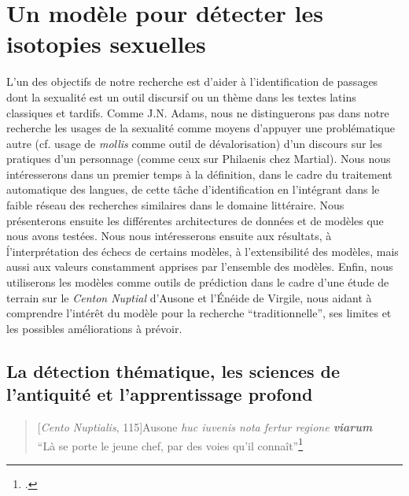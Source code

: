 \chapter{Un modèle pour détecter les isotopies sexuelles}

L'un des objectifs de notre recherche est d'aider à l'identification de passages dont la sexualité est un outil discursif ou un thème dans les textes latins classiques et tardifs. Comme J.N. Adams, nous ne distinguerons pas dans notre recherche les usages de la sexualité comme moyens d'appuyer une problématique autre (cf. usage de \textit{mollis} comme outil de dévalorisation) d'un discours sur les pratiques d'un personnage (comme ceux sur Philaenis chez Martial). Nous nous intéresserons dans un premier temps à la définition, dans le cadre du traitement automatique des langues, de cette tâche d'identification en l'intégrant dans le faible réseau des recherches similaires dans le domaine littéraire. Nous présenterons ensuite les différentes architectures de données et de modèles que nous avons testées. Nous nous intéresserons ensuite aux résultats, à ĺ'interprétation des échecs de certains modèles, à l'extensibilité des modèles, mais aussi aux valeurs constamment apprises par l'ensemble des modèles. Enfin, nous utiliserons les modèles comme outils de prédiction dans le cadre d'une étude de terrain sur le \textit{Centon Nuptial} d'Ausone et l'Énéide de Virgile, nous aidant à comprendre l'intérêt du modèle pour la recherche \enquote{traditionnelle}, ses limites et les possibles améliorations à prévoir.

\section{La détection thématique, les sciences de l'antiquité et l'apprentissage profond}


\begin{quote}[\textit{Cento Nuptialis}, 115]{Ausone}
    \textit{huc iuvenis nota fertur regione \textbf{viarum}} \\
    \enquote{Là se porte le jeune chef, par des voies qu'il connaît}\footcite{ausone_d_2010}
\end{quote}

